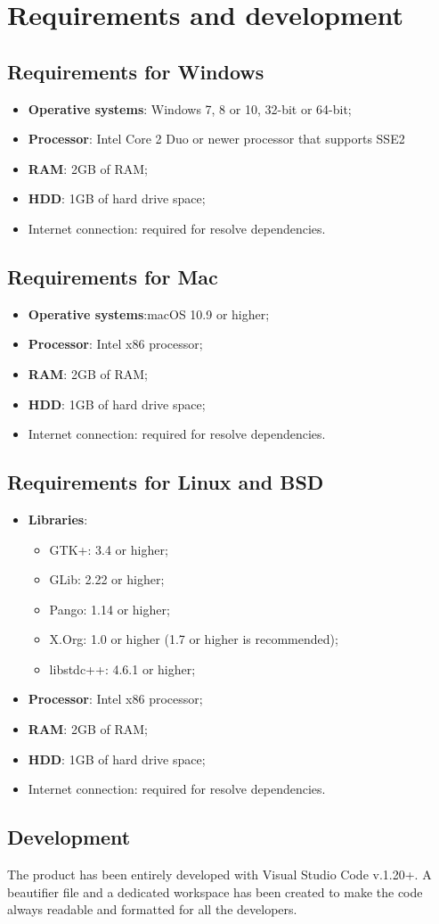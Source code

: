 \section{Requirements and development}
\subsection{Requirements for Windows}
\begin{itemize}
	\item \textbf{Operative systems}: Windows 7, 8 or 10, 32-bit or 64-bit;
	\item \textbf{Processor}: Intel Core 2 Duo or newer processor that supports SSE2
	\item \textbf{RAM}: 2GB of RAM;
	\item \textbf{HDD}: 1GB of hard drive space;
	\item Internet connection: required for resolve dependencies.
\end{itemize}

\subsection{Requirements for Mac}
\begin{itemize}
	\item \textbf{Operative systems}:macOS 10.9 or higher;
	\item \textbf{Processor}: Intel x86 processor;
	\item \textbf{RAM}: 2GB of RAM;
	\item \textbf{HDD}: 1GB of hard drive space;
	\item Internet connection: required for resolve dependencies.
\end{itemize}
			
\subsection{Requirements for Linux and BSD}
\begin{itemize}
	\item \textbf{Libraries}:
	\begin{itemize}
		\item GTK+: 3.4 or higher;
		\item GLib: 2.22 or higher;
		\item Pango: 1.14 or higher;
		\item X.Org: 1.0 or higher (1.7 or higher is recommended);
		\item libstdc++: 4.6.1 or higher;
	\end{itemize}
	\item \textbf{Processor}: Intel x86 processor;
	\item \textbf{RAM}: 2GB of RAM;
	\item \textbf{HDD}: 1GB of hard drive space;
	\item Internet connection: required for resolve dependencies.
\end{itemize}	

\subsection{Development}
The product has been entirely developed with Visual Studio Code v.1.20+. A beautifier file and a dedicated workspace has been created to make the code always readable and formatted for all the developers.
